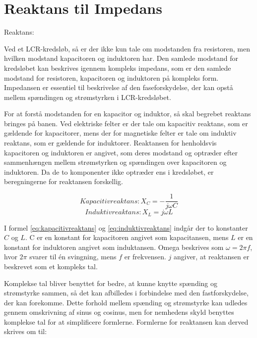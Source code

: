 \section{Reaktans til Impedans}
Reaktans:

Ved et LCR-kredsløb, så er der ikke kun tale om modstanden fra resistoren, men hvilken modstand kapacitoren og induktoren har. Den samlede modstand for kredsløbet kan beskrives igennem kompleks impedans, som er den samlede modstand for resistoren, kapacitoren og induktoren på kompleks form. Impedansen er essentiel til beskrivelse af den faseforskydelse, der kan opstå mellem spændingen og strømstyrken i LCR-kredsløbet.

For at forstå modstanden for en kapacitor og induktor, så skal begrebet reaktans bringes på banen. Ved elektriske felter er der tale om kapacitiv reaktans, som er gældende for kapacitorer, mens der for magnetiske felter er tale om induktiv reaktans, som er gældende for induktorer. Reaktansen for henholdsvis kapacitoren og induktoren er angivet, som deres modstand og optræder efter sammenhængen mellem strømstyrken og spændingen over kapacitoren og induktoren. Da de to komponenter ikke optræder ens i kredsløbet, er beregningerne for reaktansen forskellig. \cite{reaktans}

\begin{equation}
Kapacitiv reaktans: X_C = - \frac{1}{j \omega C}
\label{eq:kapacitivreaktans}
\end{equation}
\begin{equation}
Induktiv reaktans: X_L = j \omega L
\label{eq:induktivreaktans}
\end{equation}

I formel \ref{eq:kapacitivreaktans} og \ref{eq:induktivreaktans} indgår der to konstanter $C$ og $L$. C er en konstant for kapacitoren angivet som kapacitansen, mens $L$ er en konstant for induktoren angivet som induktansen. Omega beskrives som $\omega = 2 \pi f$, hvor $2 \pi$ svarer til én svingning, mens $f$ er frekvensen. $j$ angiver, at reaktansen er beskrevet som et kompleks tal.

Komplekse tal bliver benyttet for bedre, at kunne knytte spænding og strømstyrke sammen, så det kan afbilledes i forbindelse med den fastforskydelse, der kan forekomme. Dette forhold mellem spænding og strømstyrke kan udledes gennem omskrivning af sinus og cosinus, men for nemhedens skyld benyttes komplekse tal for at simplificere formlerne. Formlerne for reaktansen kan derved skrives om til: \cite{reaktans}

